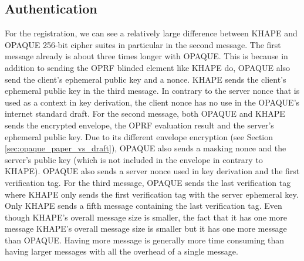 ﻿\documentclass[../report.tex]{subfiles}
\begin{document}


\subsection*{Authentication}
For the registration, we can see a relatively large difference between KHAPE and OPAQUE 256-bit cipher suites in particular in the second message.
The first message already is about three times longer with OPAQUE. This is because in addition to sending the OPRF blinded element like KHAPE do, OPAQUE also send the client's ephemeral public key and a nonce. KHAPE sends the client's ephemeral public key in the third message.
In contrary to the server nonce that is used as a context in key derivation, the client nonce has no use in the OPAQUE's internet standard draft.
For the second message, both OPAQUE and KHAPE sends the encrypted envelope, the OPRF evaluation result and the server's ephemeral public key.
Due to its different envelope encryption (see Section \ref{sec:opaque_paper_vs_draft}), OPAQUE also sends a masking nonce and the server's public key (which is not included in the envelope in contrary to KHAPE).
OPAQUE also sends a server nonce used in key derivation and the first verification tag.
For the third message, OPAQUE sends the last verification tag where KHAPE only sends the first verification tag with the server ephemeral key.
Only KHAPE sends a fifth message containing the last verification tag.
Even though KHAPE's overall message size is smaller, the fact that it has one more message 
KHAPE's overall message size is smaller but it has one more message than OPAQUE. Having more message is generally more time consuming than having larger messages with all the overhead of a single message.
\end{document}

